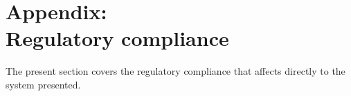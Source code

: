 
\chapter {Appendix: \\Regulatory compliance}

The present section covers the regulatory compliance that affects directly to the system presented. 






	
